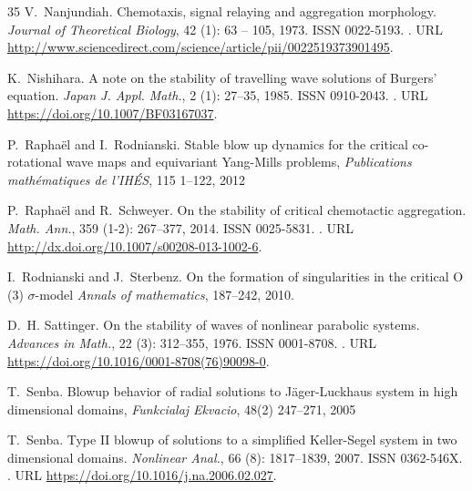 \documentclass[11pt]{aims}
\theoremstyle{definition}
\numberwithin{equation}{section}
\begin{document}
\begin{thebibliography}{35}
V.~Nanjundiah.
\newblock Chemotaxis, signal relaying and aggregation morphology.
\newblock \emph{Journal of Theoretical Biology}, 42 (1): 63
  -- 105, 1973.
\newblock ISSN 0022-5193.
\newblock {}.
\newblock URL
  \url{http://www.sciencedirect.com/science/article/pii/0022519373901495}.

K.~Nishihara.
\newblock A note on the stability of travelling wave solutions of {B}urgers'
  equation.
\newblock \emph{Japan J. Appl. Math.}, 2 (1): 27--35, 1985.
\newblock ISSN 0910-2043.
\newblock {}.
\newblock URL \url{https://doi.org/10.1007/BF03167037}.

P.~Rapha{\"e}l and I.~Rodnianski.
\newblock Stable blow up dynamics for the critical co-rotational wave maps and equivariant Yang-Mills problems,
\newblock \emph{Publications math{\'e}matiques de l'IH{\'E}S}, 115 1--122, 2012


P.~Rapha{\"e}l and R.~Schweyer.
\newblock On the stability of critical chemotactic aggregation.
\newblock \emph{Math. Ann.}, 359 (1-2): 267--377, 2014.
\newblock ISSN 0025-5831.
\newblock {}.
\newblock URL \url{http://dx.doi.org/10.1007/s00208-013-1002-6}.

I.~Rodnianski and J.~Sterbenz.
\newblock On the formation of singularities in the critical O (3) $\sigma$-model
\newblock \emph{Annals of mathematics}, 187--242, 2010.


D.~H. Sattinger.
\newblock On the stability of waves of nonlinear parabolic systems.
\newblock \emph{Advances in Math.}, 22 (3): 312--355, 1976.
\newblock ISSN 0001-8708.
\newblock {}.
\newblock URL \url{https://doi.org/10.1016/0001-8708(76)90098-0}.

T.~Senba.
\newblock Blowup behavior of radial solutions to J{\"a}ger-Luckhaus system in high dimensional domains,
\newblock \emph{Funkcialaj Ekvacio}, 48(2) 247--271, 2005

T.~Senba.
\newblock Type {II} blowup of solutions to a simplified {K}eller-{S}egel system
  in two dimensional domains.
\newblock \emph{Nonlinear Anal.}, 66 (8): 1817--1839, 2007.
\newblock ISSN 0362-546X.
\newblock {}.
\newblock URL \url{https://doi.org/10.1016/j.na.2006.02.027}.


\end{thebibliography}
\end{document}
